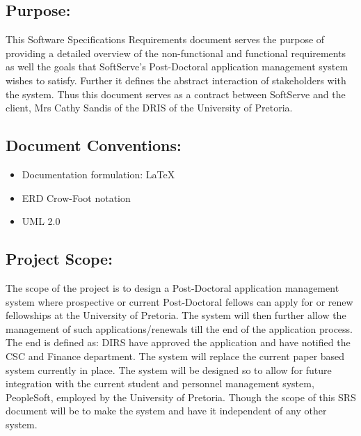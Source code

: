 \documentclass[12pt]{article}
\begin{document}
\subsection{Purpose:}
\vspace{0.2in}
This Software Specifications Requirements document serves the purpose of providing a detailed overview of the non-functional and functional requirements as well the goals that SoftServe's Post-Doctoral application management system wishes to satisfy. Further it defines the abstract interaction of stakeholders with the system. Thus this document serves as a contract between SoftServe and the client, Mrs Cathy Sandis of the DRIS of the University of Pretoria.

\vspace{0.2in}

\subsection{Document Conventions:}
\vspace{0.1in}
\begin{itemize}
\item Documentation formulation: LaTeX
\item ERD Crow-Foot notation
\item UML 2.0
\end{itemize}

\vspace{0.2in}

\subsection{Project Scope:}
\vspace{0.2in}	
The scope of the project is to design a Post-Doctoral application management system where prospective or current Post-Doctoral fellows can apply for or renew fellowships at the University of Pretoria. The system will then further allow the management of such applications/renewals till the end of the application process. The end is defined as: DIRS have approved the application and have notified the CSC and Finance department. The system will replace the current paper based system currently in place. The system will be designed so to allow for future integration with the current student and personnel management system, PeopleSoft, employed by the University of Pretoria. Though the scope of this SRS document will be to make the system and have it independent of any other system.
\vspace{0.2in}
\end{document}
